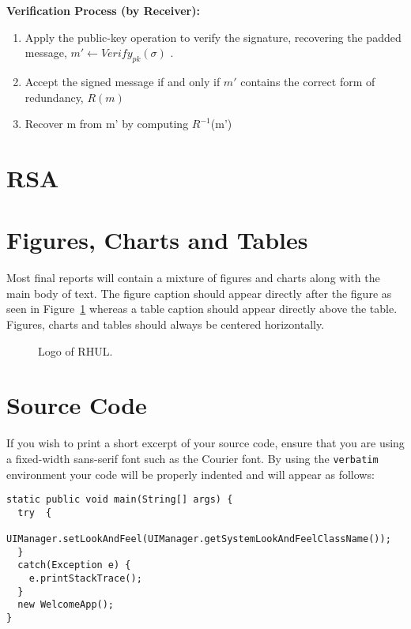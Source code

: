\documentclass[]{final_report}
\theoremstyle{definition}
\begin{document}
\textbf{Verification Process (by Receiver):}
\begin{enumerate}
    \item Apply the public-key operation to verify the signature, recovering the padded message,  \( m' \leftarrow Verify_{pk}(\sigma) \) .
    \item Accept the signed message if and only if \( m' \) contains the correct form of redundancy, \( R(m) \) 
    \item Recover m from m' by computing $R^{-1}$(m') 
\end{enumerate}


\section{RSA}








\section{Figures, Charts and Tables}

Most final reports will contain a mixture of figures and charts along with the main body of text. The figure caption should appear directly after the figure as seen in Figure~\ref{fig:logo} whereas a table caption should appear directly above the table. Figures, charts and tables should always be centered horizontally. 

\begin{figure}[h]
\centering
\fboxsep 2mm
\caption{\label{fig:logo} Logo of RHUL.}
\end{figure} 

\section{Source Code}

If you wish to print a short excerpt of your source code,  ensure that you are using a fixed-width sans-serif font such as the Courier font. By using the \verb|verbatim| environment your code will be properly indented and will appear as follows:

\begin{verbatim}
static public void main(String[] args) {
  try  {
    UIManager.setLookAndFeel(UIManager.getSystemLookAndFeelClassName());
  }
  catch(Exception e) {
    e.printStackTrace();
  }
  new WelcomeApp();
} 
\end{verbatim}
\end{document}
